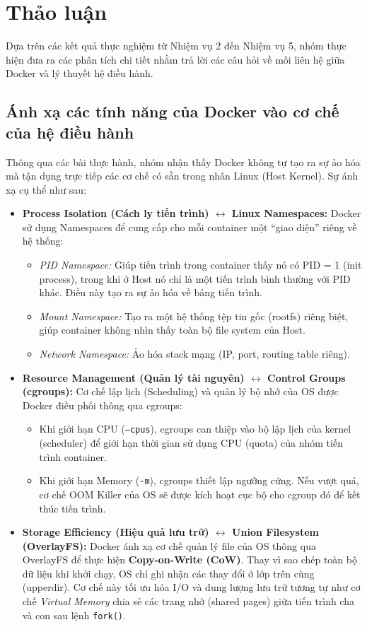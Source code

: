 \newpage
\section{Thảo luận}
Dựa trên các kết quả thực nghiệm từ Nhiệm vụ 2 đến Nhiệm vụ 5, nhóm thực hiện đưa ra các phân tích chi tiết nhằm trả lời các câu hỏi về mối liên hệ giữa Docker và lý thuyết hệ điều hành.

\subsection{Ánh xạ các tính năng của Docker vào cơ chế của hệ điều hành}
Thông qua các bài thực hành, nhóm nhận thấy Docker không tự tạo ra sự ảo hóa mà tận dụng trực tiếp các cơ chế có sẵn trong nhân Linux (Host Kernel). Sự ánh xạ cụ thể như sau:

\begin{itemize}
    \item \textbf{Process Isolation (Cách ly tiến trình) $\leftrightarrow$ Linux Namespaces:}
    Docker sử dụng Namespaces để cung cấp cho mỗi container một ``giao diện'' riêng về hệ thống:
    \begin{itemize}
        \item \textit{PID Namespace:} Giúp tiến trình trong container thấy nó có PID = 1 (init process), trong khi ở Host nó chỉ là một tiến trình bình thường với PID khác. Điều này tạo ra sự ảo hóa về bảng tiến trình.
        \item \textit{Mount Namespace:} Tạo ra một hệ thống tệp tin gốc (rootfs) riêng biệt, giúp container không nhìn thấy toàn bộ file system của Host.
        \item \textit{Network Namespace:} Ảo hóa stack mạng (IP, port, routing table riêng).
    \end{itemize}

    \item \textbf{Resource Management (Quản lý tài nguyên) $\leftrightarrow$ Control Groups (cgroups):}
    Cơ chế lập lịch (Scheduling) và quản lý bộ nhớ của OS được Docker điều phối thông qua cgroups:
    \begin{itemize}
        \item Khi giới hạn CPU (\texttt{--cpus}), cgroups can thiệp vào bộ lập lịch của kernel (scheduler) để giới hạn thời gian sử dụng CPU (quota) của nhóm tiến trình container.
        \item Khi giới hạn Memory (\texttt{-m}), cgroups thiết lập ngưỡng cứng. Nếu vượt quá, cơ chế OOM Killer của OS sẽ được kích hoạt cục bộ cho cgroup đó để kết thúc tiến trình.
    \end{itemize}

    \item \textbf{Storage Efficiency (Hiệu quả lưu trữ) $\leftrightarrow$ Union Filesystem (OverlayFS):}
    Docker ánh xạ cơ chế quản lý file của OS thông qua OverlayFS để thực hiện \textbf{Copy-on-Write (CoW)}. Thay vì sao chép toàn bộ dữ liệu khi khởi chạy, OS chỉ ghi nhận các thay đổi ở lớp trên cùng (upperdir). Cơ chế này tối ưu hóa I/O và dung lượng lưu trữ tương tự như cơ chế \textit{Virtual Memory} chia sẻ các trang nhớ (shared pages) giữa tiến trình cha và con sau lệnh \texttt{fork()}.
\end{itemize}


